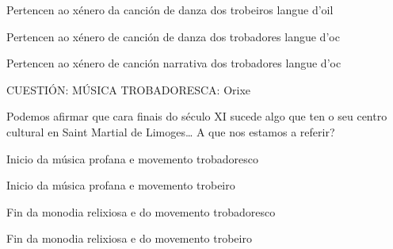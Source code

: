 Pertencen ao xénero da canción de danza dos trobeiros langue d'oil

Pertencen ao xénero de canción de danza dos trobadores langue d'oc

Pertencen ao xénero de canción narrativa dos trobadores langue d'oc



CUESTIÓN: MÚSICA TROBADORESCA: Orixe

Podemos afirmar que cara finais do século XI sucede algo que ten o seu centro cultural en Saint Martial de Limoges… A que nos estamos a referir?

Inicio da música profana e movemento trobadoresco

Inicio da música profana e movemento trobeiro

Fin da monodia relixiosa e do movemento trobadoresco

Fin da monodia relixiosa e do movemento trobeiro 

